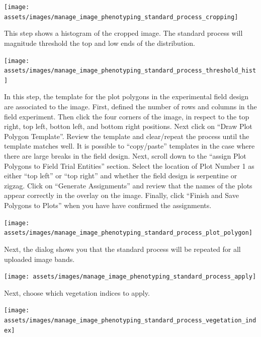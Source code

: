 \documentclass[
  12pt,
]{book}
\begin{document}
\begin{center}\texttt{[image: assets/images/manage\_image\_phenotyping\_standard\_process\_cropping]} \end{center}

This step shows a histogram of the cropped image. The standard process will magnitude threshold the top and low ends of the distribution.

\begin{center}\texttt{[image: assets/images/manage\_image\_phenotyping\_standard\_process\_threshold\_hist]} \end{center}

In this step, the template for the plot polygons in the experimental field design are associated to the image. First, defined the number of rows and columns in the field experiment. Then click the four corners of the image, in respect to the top right, top left, botton left, and bottom right positions. Next click on ``Draw Plot Polygon Template''. Review the template and clear/repeat the process until the template matches well. It is possible to ``copy/paste'' templates in the case where there are large breaks in the field design. Next, scroll down to the ``assign Plot Polygons to Field Trial Entities'' section. Select the location of Plot Number 1 as either ``top left'' or ``top right'' and whether the field design is serpentine or zigzag. Click on ``Generate Assignments'' and review that the names of the plots appear correctly in the overlay on the image. Finally, click ``Finish and Save Polygons to Plots'' when you have have confirmed the assignments.

\begin{center}\texttt{[image: assets/images/manage\_image\_phenotyping\_standard\_process\_plot\_polygon]} \end{center}

Next, the dialog shows you that the standard process will be repeated for all uploaded image bands.

\begin{center}\texttt{[image: assets/images/manage\_image\_phenotyping\_standard\_process\_apply]} \end{center}

Next, choose which vegetation indices to apply.

\begin{center}\texttt{[image: assets/images/manage\_image\_phenotyping\_standard\_process\_vegetation\_index]} \end{center}
\end{document}
